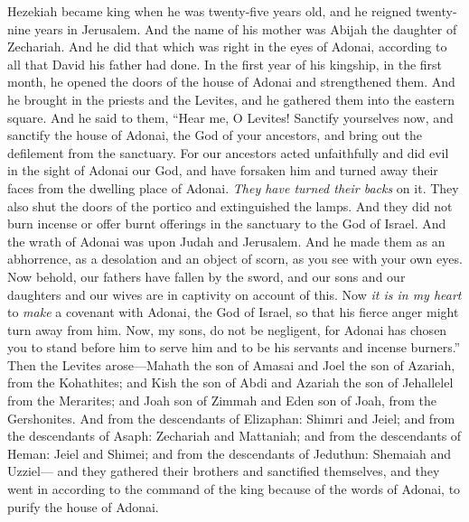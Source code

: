 \begin{biblechapter} %
 Hezekiah became king when he was twenty-five years old, and he reigned twenty-nine years in Jerusalem. And the name of his mother was Abijah the daughter of Zechariah.
\verse And he did that which was right in the eyes of Adonai, according to all that David his father had done.
\verse In the first year of his kingship, in the first month, he opened the doors of the house of Adonai and strengthened them.
\verse And he brought in the priests and the Levites, and he gathered them into the eastern square.
\verse And he said to them, “Hear me, O Levites! Sanctify yourselves now, and sanctify the house of Adonai, the God of your ancestors, and bring out the defilement from the sanctuary.
\verse For our ancestors acted unfaithfully and did evil in the sight of Adonai our God, and have forsaken him and turned away their faces from the dwelling place of Adonai. \textit{They have turned their backs} on it.
\verse They also shut the doors of the portico and extinguished the lamps. And they did not burn incense or offer burnt offerings in the sanctuary to the God of Israel.
\verse And the wrath of Adonai was upon Judah and Jerusalem. And he made them as an abhorrence, as a desolation and an object of scorn, as you see with your own eyes.
\verse Now behold, our fathers have fallen by the sword, and our sons and our daughters and our wives are in captivity on account of this.
\verse Now \textit{it is in my heart} to \textit{make} a covenant with Adonai, the God of Israel, so that his fierce anger might turn away from him.
\verse Now, my sons, do not be negligent, for Adonai has chosen you to stand before him to serve him and to be his servants and incense burners.”
\verse Then the Levites arose—Mahath the son of Amasai and Joel the son of Azariah, from the Kohathites; and Kish the son of Abdi and Azariah the son of Jehallelel from the Merarites; and Joah son of Zimmah and Eden son of Joah, from the Gershonites.
\verse And from the descendants of Elizaphan: Shimri and Jeiel; and from the descendants of Asaph: Zechariah and Mattaniah;
\verse and from the descendants of Heman: Jeiel and Shimei; and from the descendants of Jeduthun: Shemaiah and Uzziel—
\verse and they gathered their brothers and sanctified themselves, and they went in according to the command of the king because of the words of Adonai, to purify the house of Adonai.

\end{biblechapter}
